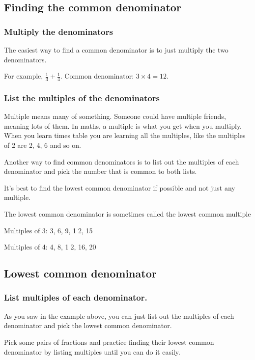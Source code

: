 \documentclass[16pt]{article}
\begin{document}
\begin{spacing}{1.25}
\pagebreak

\subsection*{Finding the common denominator}

\subsubsection*{Multiply the denominators}
The easiest way to find a common denominator is to just multiply the two denominators.

For example, $\frac{1}{3} + \frac{1}{4}$. Common denominator: $3 \times 4 = 12$.\\

\subsubsection*{List the multiples of the denominators}
Multiple means many of something. Someone could have multiple friends, meaning lots of them. In maths, a multiple is what you get when you multiply. When you learn times table you are learning all the multiples, like the multiples of 2 are 2, 4, 6 and so on.

Another way to find common denominators is to list out the multiples of each denominator and pick the number that is common to both lists.

It's best to find the lowest common denominator if possible and not just any multiple.

The lowest common denominator is sometimes called the lowest common multiple

Multiples of 3: 3, 6, 9, \textcircled{12}, 15

Multiples of 4: 4, 8, \textcircled{12}, 16, 20

\pagebreak

\subsection*{Lowest common denominator}

\subsubsection*{List multiples of each denominator.} As you saw in the example above, you can just list out the multiples of each denominator and pick the lowest common denominator.

\vspace{28pt}
Pick some pairs of fractions and practice finding their lowest common denominator by listing multiples until you can do it easily.


\end{spacing}
\end{document}
